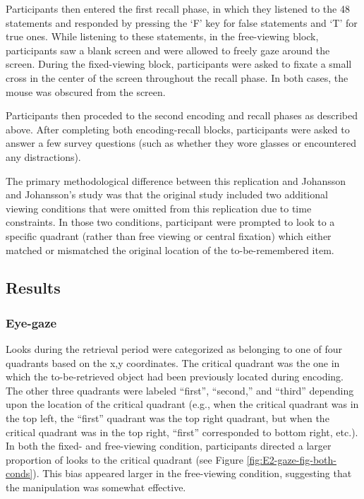 \documentclass[
  man,floatsintext]{apa6}
\begin{document}
Participants then entered the first recall phase, in which they listened to the 48 statements and
responded by pressing the `F' key for false statements and `T' for true
ones. While listening to these statements, in
the free-viewing block, participants saw a blank screen and were allowed
to freely gaze around the screen. During the fixed-viewing block,
participants were asked to fixate a small cross in the center of the
screen throughout the recall phase. In both cases, the mouse was
obscured from the screen.

Participants then proceded to the second encoding and recall phases as described above. After completing both encoding-recall blocks, participants were asked to
answer a few survey questions (such as whether they wore glasses or
encountered any distractions).

The primary methodological difference between this replication and
Johansson and Johansson's study was that the original study included two
additional viewing conditions that were omitted from this replication
due to time constraints. In those two conditions, participant were
prompted to look to a specific quadrant (rather than free viewing or
central fixation) which either matched or mismatched the original
location of the to-be-remembered item.

\subsection{Results}\label{results-2}

\subsubsection{Eye-gaze}\label{eye-gaze}

Looks during the retrieval period were categorized as belonging to one of four quadrants based on the x,y coordinates. The critical quadrant was the one in which the to-be-retrieved object had been previously located during encoding. The other three quadrants were labeled ``first'', ``second,'' and ``third'' depending upon the location of the critical quadrant (e.g., when the critical quadrant was in the top left, the ``first'' quadrant was the top right quadrant, but when the critical quadrant was in the top right, ``first'' corresponded to bottom right, etc.). In both the fixed- and free-viewing condition, participants directed a larger proportion of looks to the critical quadrant (see Figure \ref{fig:E2-gaze-fig-both-conds}). This bias appeared larger in the free-viewing condition, suggesting that the manipulation was somewhat effective.
\end{document}
